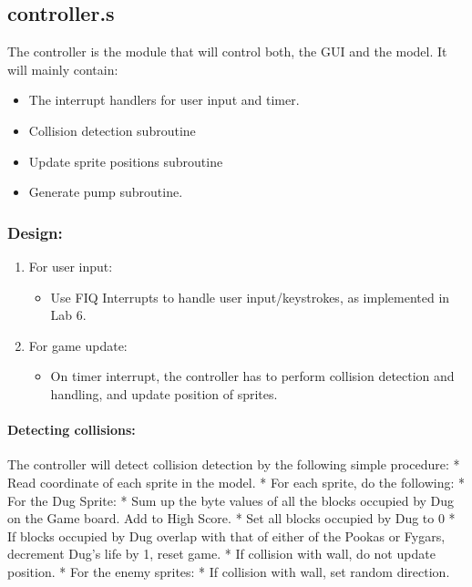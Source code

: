 \documentclass[]{article}
\begin{document}
\subsection{controller.s}\label{controller.s}

The controller is the module that will control both, the GUI and the
model. It will mainly contain:

\begin{itemize}
\itemsep1pt\parskip0pt
\item
  The interrupt handlers for user input and timer.
\item
  Collision detection subroutine
\item
  Update sprite positions subroutine
\item
  Generate pump subroutine.
\end{itemize}

\subsubsection{Design:}\label{design-2}

\begin{enumerate}
\def\labelenumi{\arabic{enumi}.}
\itemsep1pt\parskip0pt
\item
  For user input:

  \begin{itemize}
  \itemsep1pt\parskip0pt
  \item
    Use FIQ Interrupts to handle user input/keystrokes, as implemented
    in Lab 6.
  \end{itemize}
\item
  For game update:

  \begin{itemize}
  \itemsep1pt\parskip0pt
  \item
    On timer interrupt, the controller has to perform collision
    detection and handling, and update position of sprites.
  \end{itemize}
\end{enumerate}

\paragraph{Detecting collisions:}\label{detecting-collisions}

The controller will detect collision detection by the following simple
procedure: * Read coordinate of each sprite in the model. * For each
sprite, do the following: * For the Dug Sprite: * Sum up the byte values
of all the blocks occupied by Dug on the Game board. Add to High Score.
* Set all blocks occupied by Dug to 0 * If blocks occupied by Dug
overlap with that of either of the Pookas or Fygars, decrement Dug's
life by 1, reset game. * If collision with wall, do not update position.
* For the enemy sprites: * If collision with wall, set random direction.
\end{document}
